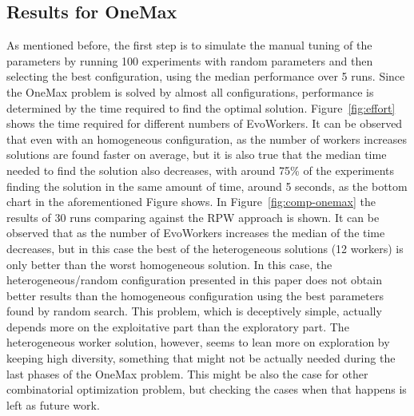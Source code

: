 \documentclass[conference]{IEEEtran}
\begin{document}
\subsection{Results for OneMax}

As mentioned before, the first step is to simulate the manual tuning of the parameters
by running 100 experiments with random parameters and then selecting the best configuration,
using the median performance over 5 runs. Since the OneMax problem is solved by almost all
configurations, performance is determined by the time required to find the optimal solution.
Figure~\ref{fig:effort} shows the time required for different numbers of EvoWorkers.
It can be observed that even with an homogeneous configuration, as the number of workers
increases solutions are found faster on average, but it is also true
that the median time needed to find the solution also decreases,
with around 75\% of the experiments finding the solution in the same
amount of time, around 5 seconds, as the bottom chart in the
aforementioned Figure shows.  
In Figure~\ref{fig:comp-onemax} the results of 30 runs comparing against the RPW approach is shown.
It can be observed that as the number of EvoWorkers increases the median of the time decreases, but
in this case the best of the heterogeneous solutions (12 workers) is only better than the worst homogeneous
solution. In this case, the heterogeneous/random configuration
presented in this paper does not obtain better results than the
homogeneous configuration using the best parameters found by random
search. This problem, which is deceptively simple, actually depends
more on the exploitative part than the exploratory part. The
heterogeneous worker solution, however, seems to lean more on
exploration by keeping high diversity, something that might not be
actually needed during the last phases of the OneMax problem. This
might be also the case for other combinatorial optimization problem,
but checking the cases when that happens is left as future work.
\end{document}
